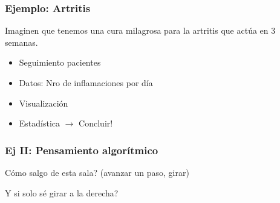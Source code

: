 \documentclass[14pt,aspectratio=169,xcolor=dvipsnames]{beamer}
\begin{document}
\begin{frame}[t]\frametitle{Ejemplo: Artritis}
Imaginen que tenemos una cura milagrosa para la artritis que actúa en 3 semanas. 
\begin{itemize}
    \item<1-> Seguimiento pacientes 

    \item<2-> Datos: Nro de inflamaciones por día
    \item<3-> Visualización
    \item<4-> Estadística $\to$ Concluir!
\end{itemize}
\end{frame}
\begin{frame}\frametitle{Ej II: Pensamiento algorítmico}
Cómo salgo de esta sala? (avanzar un paso, girar)

\vspace{2cm}
\pause Y si solo sé girar a la derecha?

\end{frame}
\end{document}
